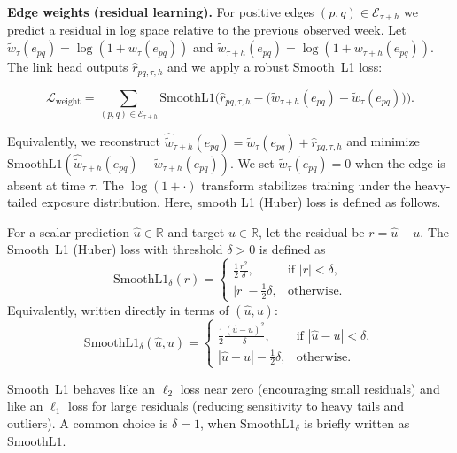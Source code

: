 \textbf{Edge weights (residual learning).}
For positive edges $(p,q)\in\mathcal{E}_{\tau+h}$ we predict a residual in log space relative to the previous observed week. Let $\tilde{w}_{\tau}(e_{pq})=\log(1+w_{\tau}(e_{pq}))$ and $\tilde{w}_{\tau+h}(e_{pq})=\log(1+w_{\tau+h}(e_{pq}))$. The link head outputs $\widehat{r}_{pq,\tau,h}$ and we apply a robust Smooth~L1 loss:

\begin{equation}
\mathcal{L}_{\text{weight}}
=
\sum_{(p,q)\in\mathcal{E}_{\tau+h}}
\mathrm{SmoothL1}\!\Big(
\widehat{r}_{pq,\tau,h}
-
\big(\tilde{w}_{\tau+h}(e_{pq})-\tilde{w}_{\tau}(e_{pq})\big)
\Big).
\label{eq:loss-weight}
\end{equation}

Equivalently, we reconstruct $\widehat{\tilde{w}}_{\tau+h}(e_{pq})=\tilde{w}_{\tau}(e_{pq})+\widehat{r}_{pq,\tau,h}$ and minimize $\mathrm{SmoothL1}(\widehat{\tilde{w}}_{\tau+h}(e_{pq})-\tilde{w}_{\tau+h}(e_{pq}))$. We set $\tilde{w}_{\tau}(e_{pq})=0$ when the edge is absent at time $\tau$. The $\log(1+\cdot)$ transform stabilizes training under the heavy-tailed exposure distribution. Here, smooth L1 (Huber) loss is defined as follows.

\begin{definition}
For a scalar prediction $\hat{u}\in\mathbb{R}$ and target $u\in\mathbb{R}$, let the residual be $r=\hat{u}-u$.
The Smooth~L1 (Huber) loss with threshold $\delta>0$ is defined as
\begin{equation}
\mathrm{SmoothL1}_\delta(r)=
\begin{cases}
\frac{1}{2}\frac{r^2}{\delta}, & \text{if } |r|<\delta,\\[6pt]
|r|-\frac{1}{2}\delta, & \text{otherwise}.
\end{cases}
\label{eq:smoothl1}
\end{equation}
Equivalently, written directly in terms of $(\hat{u},u)$:
\begin{equation}
\mathrm{SmoothL1}_\delta(\hat{u},u)=
\begin{cases}
\frac{1}{2}\frac{(\hat{u}-u)^2}{\delta}, & \text{if } |\hat{u}-u|<\delta,\\[6pt]
|\hat{u}-u|-\frac{1}{2}\delta, & \text{otherwise}.
\end{cases}
\end{equation}
\end{definition}

Smooth~L1 behaves like an $\ell_2$ loss near zero (encouraging small residuals) and like an $\ell_1$ loss for large residuals (reducing sensitivity to heavy tails and outliers). A common choice is $\delta=1$, when $\mathrm{SmoothL1}_\delta$ is briefly written as $\mathrm{SmoothL1}$.

